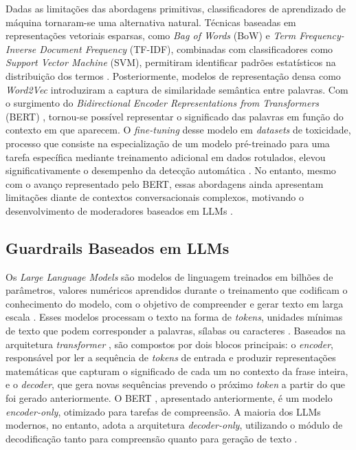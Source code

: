 Dadas as limitações das abordagens primitivas, classificadores de aprendizado de máquina tornaram-se uma alternativa natural. Técnicas baseadas em representações vetoriais esparsas, como \textit{Bag of Words} (BoW) e \textit{Term Frequency-Inverse Document Frequency} (TF-IDF), combinadas com classificadores como \textit{Support Vector Machine} (SVM), permitiram identificar padrões estatísticos na distribuição dos termos \cite{fortuna2018, wulczyn2017exmachina}. Posteriormente, modelos de representação densa como \textit{Word2Vec} \cite{mikolov2013efficient} introduziram a captura de similaridade semântica entre palavras. Com o surgimento do \textit{Bidirectional Encoder Representations from Transformers} (BERT) \cite{devlin-etal-2019-bert}, tornou-se possível representar o significado das palavras em função do contexto em que aparecem. O \textit{fine-tuning} desse modelo em \textit{datasets} de toxicidade, processo que consiste na especialização de um modelo pré-treinado para uma tarefa específica mediante treinamento adicional em dados rotulados, elevou significativamente o desempenho da detecção automática \cite{mozafari2020bert}. No entanto, mesmo com o avanço representado pelo BERT, essas abordagens ainda apresentam limitações diante de contextos conversacionais complexos, motivando o desenvolvimento de moderadores baseados em LLMs \cite{inan2023llamaguard}.

\subsection{Guardrails Baseados em LLMs}

Os \textit{Large Language Models} são modelos de linguagem treinados em bilhões de parâmetros, valores numéricos aprendidos durante o treinamento que codificam o conhecimento do modelo, com o objetivo de compreender e gerar texto em larga escala \cite{zhao2023survey}. Esses modelos processam o texto na forma de \textit{tokens}, unidades mínimas de texto que podem corresponder a palavras, sílabas ou caracteres \cite{zhao2023survey}. Baseados na arquitetura \textit{transformer} \cite{vaswani2017attention}, são compostos por dois blocos principais: o \textit{encoder}, responsável por ler a sequência de \textit{tokens} de entrada e produzir representações matemáticas que capturam o significado de cada um no contexto da frase inteira, e o \textit{decoder}, que gera novas sequências prevendo o próximo \textit{token} a partir do que foi gerado anteriormente. O BERT \cite{devlin-etal-2019-bert}, apresentado anteriormente, é um modelo \textit{encoder-only}, otimizado para tarefas de compreensão. A maioria dos LLMs modernos, no entanto, adota a arquitetura \textit{decoder-only}, utilizando o módulo de decodificação tanto para compreensão quanto para geração de texto \cite{zhao2023survey}.

